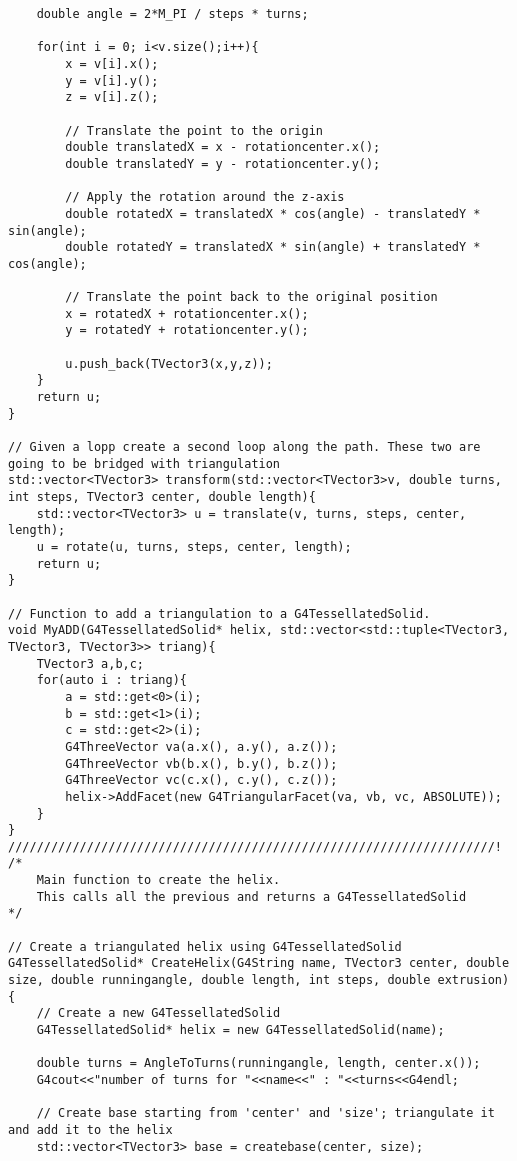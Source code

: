 \begin{lstlisting}
    double angle = 2*M_PI / steps * turns;

    for(int i = 0; i<v.size();i++){
        x = v[i].x();
        y = v[i].y();
        z = v[i].z();

        // Translate the point to the origin
        double translatedX = x - rotationcenter.x();
        double translatedY = y - rotationcenter.y();

        // Apply the rotation around the z-axis
        double rotatedX = translatedX * cos(angle) - translatedY * sin(angle);
        double rotatedY = translatedX * sin(angle) + translatedY * cos(angle);

        // Translate the point back to the original position
        x = rotatedX + rotationcenter.x();
        y = rotatedY + rotationcenter.y();
        
        u.push_back(TVector3(x,y,z));
    }
    return u;
}

// Given a lopp create a second loop along the path. These two are going to be bridged with triangulation
std::vector<TVector3> transform(std::vector<TVector3>v, double turns, int steps, TVector3 center, double length){
    std::vector<TVector3> u = translate(v, turns, steps, center, length);
    u = rotate(u, turns, steps, center, length);
    return u;
}

// Function to add a triangulation to a G4TessellatedSolid.
void MyADD(G4TessellatedSolid* helix, std::vector<std::tuple<TVector3, TVector3, TVector3>> triang){
	TVector3 a,b,c;
	for(auto i : triang){
		a = std::get<0>(i);
		b = std::get<1>(i);
		c = std::get<2>(i);
		G4ThreeVector va(a.x(), a.y(), a.z());
        G4ThreeVector vb(b.x(), b.y(), b.z());
        G4ThreeVector vc(c.x(), c.y(), c.z());
        helix->AddFacet(new G4TriangularFacet(va, vb, vc, ABSOLUTE));
	}
}
////////////////////////////////////////////////////////////////////!
/*
    Main function to create the helix. 
    This calls all the previous and returns a G4TessellatedSolid
*/

// Create a triangulated helix using G4TessellatedSolid
G4TessellatedSolid* CreateHelix(G4String name, TVector3 center, double size, double runningangle, double length, int steps, double extrusion)
{
    // Create a new G4TessellatedSolid
    G4TessellatedSolid* helix = new G4TessellatedSolid(name);

    double turns = AngleToTurns(runningangle, length, center.x());
    G4cout<<"number of turns for "<<name<<" : "<<turns<<G4endl;
	
    // Create base starting from 'center' and 'size'; triangulate it and add it to the helix
	std::vector<TVector3> base = createbase(center, size);
	

\end{lstlisting}
